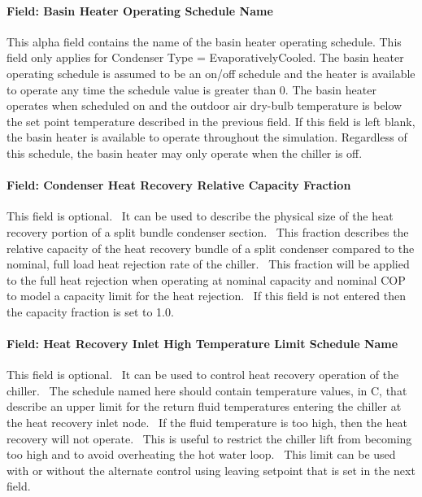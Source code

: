 \paragraph{Field: Basin Heater Operating Schedule Name}\label{field-basin-heater-operating-schedule-name-1-001}

This alpha field contains the name of the basin heater operating schedule. This field only applies for Condenser Type = EvaporativelyCooled. The basin heater operating schedule is assumed to be an on/off schedule and the heater is available to operate any time the schedule value is greater than 0. The basin heater operates when scheduled on and the outdoor air dry-bulb temperature is below the set point temperature described in the previous field. If this field is left blank, the basin heater is available to operate throughout the simulation. Regardless of this schedule, the basin heater may only operate when the chiller is off.

\paragraph{Field: Condenser Heat Recovery Relative Capacity Fraction}\label{field-condenser-heat-recovery-relative-capacity-fraction}

This field is optional.~ It can be used to describe the physical size of the heat recovery portion of a split bundle condenser section.~ This fraction describes the relative capacity of the heat recovery bundle of a split condenser compared to the nominal, full load heat rejection rate of the chiller.~ This fraction will be applied to the full heat rejection when operating at nominal capacity and nominal COP to model a capacity limit for the heat rejection.~ If this field is not entered then the capacity fraction is set to 1.0.

\paragraph{Field: Heat Recovery Inlet High Temperature Limit Schedule Name}\label{field-heat-recovery-inlet-high-temperature-limit-schedule-name}

This field is optional.~ It can be used to control heat recovery operation of the chiller.~ The schedule named here should contain temperature values, in C, that describe an upper limit for the return fluid temperatures entering the chiller at the heat recovery inlet node.~ If the fluid temperature is too high, then the heat recovery will not operate.~ This is useful to restrict the chiller lift from becoming too high and to avoid overheating the hot water loop.~ This limit can be used with or without the alternate control using leaving setpoint that is set in the next field.

